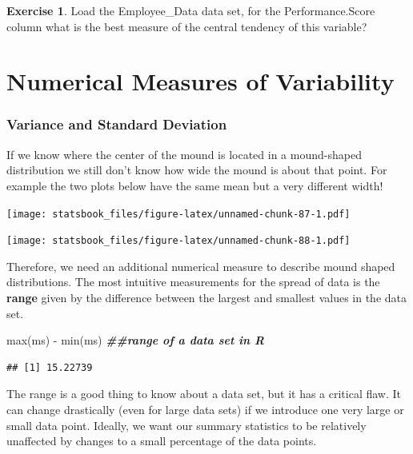 \documentclass[
]{book}
\newenvironment{Shaded}{\begin{snugshade}}{\end{snugshade}}
\newcommand{\DocumentationTok}[1]{\textcolor[rgb]{0.56,0.35,0.01}{\textbf{\textit{#1}}}}
\newcommand{\FunctionTok}[1]{\textcolor[rgb]{0.00,0.00,0.00}{#1}}
\newcommand{\NormalTok}[1]{#1}
\newcommand{\SpecialCharTok}[1]{\textcolor[rgb]{0.00,0.00,0.00}{#1}}
\theoremstyle{definition}
\theoremstyle{definition}
\theoremstyle{definition}
\newtheorem{exercise}{Exercise}[chapter]
\theoremstyle{definition}
\theoremstyle{remark}
\begin{document}
\begin{exercise}
\protect\hypertarget{exr:unnamed-chunk-86}{}\label{exr:unnamed-chunk-86}Load the Employee\_Data data set, for the Performance.Score column what is the best measure of the central tendency of this variable?
\end{exercise}

\hypertarget{numerical-measures-of-variability}{%
\section{Numerical Measures of Variability}\label{numerical-measures-of-variability}}

\hypertarget{variance-and-standard-deviation}{%
\subsubsection{Variance and Standard Deviation}\label{variance-and-standard-deviation}}

If we know where the center of the mound is located in a mound-shaped distribution we still don't know how wide the mound is about that point. For example the two plots below have the same mean but a very different width!

\texttt{[image: statsbook\_files/figure-latex/unnamed-chunk-87-1.pdf]}

\texttt{[image: statsbook\_files/figure-latex/unnamed-chunk-88-1.pdf]}

Therefore, we need an additional numerical measure to describe mound shaped distributions. The most intuitive measurements for the spread of data is the \textbf{range} given by the difference between the largest and smallest values in the data set.

\begin{Shaded}
\begin{Highlighting}[]
\FunctionTok{max}\NormalTok{(ms) }\SpecialCharTok{{-}} \FunctionTok{min}\NormalTok{(ms)  }\DocumentationTok{\#\#range of a data set in R}
\end{Highlighting}
\end{Shaded}

\begin{verbatim}
## [1] 15.22739
\end{verbatim}

The range is a good thing to know about a data set, but it has a critical flaw. It can change drastically (even for large data sets) if we introduce one very large or small data point. Ideally, we want our summary statistics to be relatively unaffected by changes to a small percentage of the data points.
\end{document}
